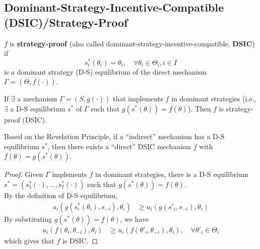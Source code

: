 \documentclass[11pt]{elegantbook_2}
\begin{document}
\subsection{Dominant-Strategy-Incentive-Compatible (DSIC)/Strategy-Proof}
\begin{definition}
    $f$ is \textbf{strategy-proof} (also called dominant-strategy-incentive-compatible, \textbf{DSIC}) if $$s^*_i(\theta_i)=\theta_i,\quad \forall \theta_i\in\Theta_i,i\in I$$ is a dominant strategy (D-S) equilibrium of the direct mechanism $\Gamma=(\Theta,f(\cdot))$.
\end{definition}

\begin{theorem}
    If $\exists$ a mechanism $\Gamma=(S,g(\cdot))$ that implements $f$ in dominant strategies (i.e., $\exists$ a D-S equilibrium $s^*$ of $\Gamma$ such that $g(s^*(\theta))=f(\theta)$). Then $f$ is strategy-proof (DSIC).
    \begin{note}
        Based on the Revelation Principle, if a ``indirect'' mechanism has a D-S equilibrium $s^*$, then there exists a ``direct'' DSIC mechanism $f$ with $f(\theta)=g(s^*(\theta))$.
    \end{note}
\end{theorem}
\begin{proof}
    Given $\Gamma$ implements $f$ in dominant strategies, there is a  D-S equilibrium $s^*=\left(s_1^*(\cdot),...,s_I^*(\cdot)\right)$ such that $g(s^*(\theta))=f(\theta)$.\\
    By the definition of D-S equilibrium,
    \begin{equation}
        \begin{aligned}
            u_i(g(s_i^*(\theta_i),s_{-i}),\theta_i)&\geq u_i(g(s'_i,s_{-i}),\theta_i)
        \end{aligned}
        \nonumber
    \end{equation}
    By substituting $g(s^*(\theta))=f(\theta)$, we have
    \begin{equation}
        \begin{aligned}
            u_i(f(\theta_i,\theta_{-i}),\theta_i)&\geq u_i(f(\theta'_i,\theta_{-i}),\theta_i),\quad \forall \theta'_i\in\Theta_i
        \end{aligned}
        \nonumber
    \end{equation}
    which gives that $f$ is DSIC.
\end{proof}
\end{document}

